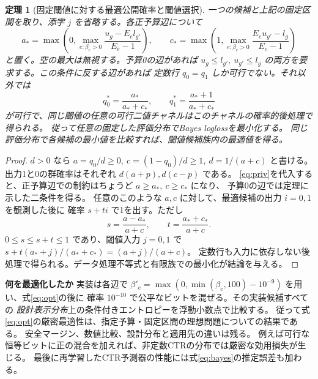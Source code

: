 \documentclass[a4paper,11pt]{ltjsarticle}
\theoremstyle{jp}
\newtheorem{thm}{定理}
\newcommand{\para}[1]{\par\Needspace{3\baselineskip}\addvspace{.6\baselineskip}\noindent\textbf{#1}\enspace}
\begin{document}
\begin{thm}[固定閾値に対する最適公開確率と閾値選択]\label{th:optimal}
一つの候補と上記の固定区間を取り、添字 \(j\) を省略する。各正予算辺について
\[
 a_*=\max\!\left(0,\max_{e:\beta_e>0}\frac{u_g-E_e l_{g'}}{E_e-1}\right),\qquad
 c_*=\max\!\left(1,\max_{e:\beta_e>0}\frac{E_e u_{g'}-l_g}{E_e-1}\right)
 \tag{4}\label{eq:ac}
\]
と置く。空の最大は無視する。予算0の辺があれば
\(u_g\le l_{g'},\ u_{g'}\le l_g\) の両方を要求する。この条件に反する辺があれば
定数行 \(q_0=q_1\) しか可行でない。それ以外では
\[
 q_0^*=\frac{a_*}{a_*+c_*},\qquad q_1^*=\frac{a_*+1}{a_*+c_*}
 \tag{5}\label{eq:opt}
\]
が可行で、同じ閾値の任意の可行二値チャネルはこのチャネルの確率的後処理で得られる。
従って任意の固定した評価分布でBayes loglossを最小化する。
同じ評価分布で各候補の最小値を比較すれば、閾値候補族内の最適値を得る。
\end{thm}
\begin{proof}
\(d>0\) なら \(a=q_0/d\ge0,\ c=(1-q_0)/d\ge1,\ d=1/(a+c)\)
と書ける。出力1と0の群確率はそれぞれ \(d(a+p),d(c-p)\) である。
\eqref{eq:priv}を代入すると、正予算辺での制約はちょうど \(a\ge a_*,\ c\ge c_*\) になり、
予算0の辺では定理に示した二条件を得る。
任意のこのような \(a,c\) に対して、最適候補の出力 \(i=0,1\) を観測した後に
確率 \(s+t i\) で1を出す。ただし
\[
 s=\frac{a-a_*}{a+c},\qquad t=\frac{a_*+c_*}{a+c}.
\]
\(0\le s\le s+t\le1\) であり、閾値入力 \(j=0,1\) で
\(s+t(a_*+j)/(a_*+c_*)=(a+j)/(a+c)\)。
定数行も入力に依存しない後処理で得られる。データ処理不等式と有限族での最小化が結論を与える。
\end{proof}

\para{何を最適化したか}
実装は各辺で \(\beta'_e=\max(0,\min(\beta_e,100)-10^{-9})\) を用い、式\eqref{eq:opt}の後に
確率 \(10^{-10}\) で公平なビットを混ぜる。その実装候補すべての
\emph{設計表示分布}上の条件付きエントロピーを浮動小数点で比較する。
従って式\eqref{eq:opt}の厳密最適性は、指定予算・固定区間の理想問題についての結果である。
安全マージン、数値比較、設計分布と適用先の違いは残る。
例えば可行な恒等ビットに正の混合を加えれば、非定数CTRの分布では厳密な効用損失が生じる。
最後に再学習したCTR予測器の性能には式\eqref{eq:bayes}の推定誤差も加わる。
\end{document}
